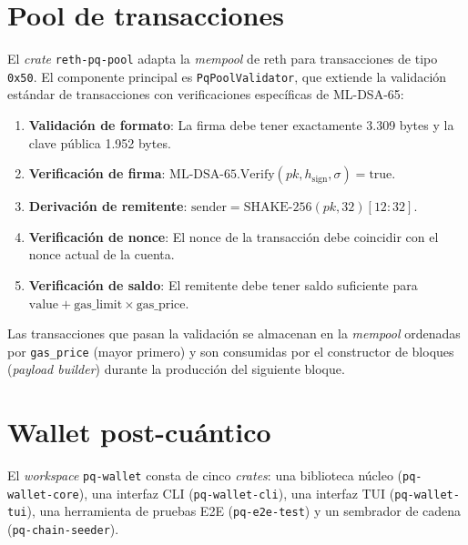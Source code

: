 \section{Pool de transacciones}
\label{sec:dev_pool}

El \emph{crate} \texttt{reth-pq-pool} adapta la \emph{mempool} de reth para transacciones de tipo \texttt{0x50}. El componente principal es \texttt{PqPoolValidator}, que extiende la validación estándar de transacciones con verificaciones específicas de ML-DSA-65:

\begin{enumerate}
  \item \textbf{Validación de formato}: La firma debe tener exactamente 3.309 bytes y la clave pública 1.952 bytes.
  \item \textbf{Verificación de firma}: $\text{ML-DSA-65.Verify}(\mathit{pk}, h_{\text{sign}}, \sigma) = \text{true}$.
  \item \textbf{Derivación de remitente}: $\text{sender} = \text{SHAKE-256}(\mathit{pk}, 32)[12{:}32]$.
  \item \textbf{Verificación de nonce}: El nonce de la transacción debe coincidir con el nonce actual de la cuenta.
  \item \textbf{Verificación de saldo}: El remitente debe tener saldo suficiente para $\text{value} + \text{gas\_limit} \times \text{gas\_price}$.
\end{enumerate}

Las transacciones que pasan la validación se almacenan en la \emph{mempool} ordenadas por \texttt{gas\_price} (mayor primero) y son consumidas por el constructor de bloques (\emph{payload builder}) durante la producción del siguiente bloque.


\section{Wallet post-cuántico}
\label{sec:dev_wallet}

El \emph{workspace} \texttt{pq-wallet} consta de cinco \emph{crates}: una biblioteca núcleo (\texttt{pq-wallet-core}), una interfaz CLI (\texttt{pq-wallet-cli}), una interfaz TUI (\texttt{pq-wallet-tui}), una herramienta de pruebas E2E (\texttt{pq-e2e-test}) y un sembrador de cadena (\texttt{pq-chain-seeder}).

